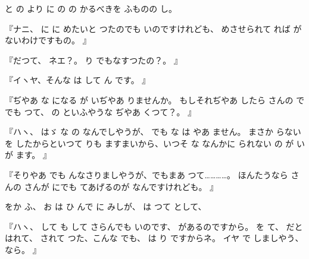 と
の
より
に
の
の
かるべきを
ふものの
し。

『ナニ、
に
に
めたいと
つたのでも
いのですけれども、
めさせられて
れば
がないわけですもの。
』

『だつて、
ネエ？。
り
でもなすつたの？。
』

『イヽヤ、そんな
は
して
ん
です。
』

『ぢやあ
な
になる
が
いぢやあ
りませんか。
もしそれぢやあ
したら
さんの
で
でも
つて、
の
といふやうな
ぢやあ
くつて？。
』

『ハヽ、
はゞ
な
の
なんでしやうが、
でも
な
は
やあ
ません。
まさか
らない
を
したからといつて
りも
ますまいから、いつそ
な
なんかに
られない
の
が
い
が
ます。
』

『そりやあ
でも
んなさりましやうが、でもまあ
つて…………。
ほんたうなら
さんの
さんが
にでも
てあげるのが
なんですけれども。
』

をか
ふ、
お
は
ひ
んで
に
みしが、
は
つて
として、

『ハヽ、
して
も
して
さらんでも
いのです、
があるのですから。
を
て、
だと
はれて、
されて
つた、こんな
でも、
は
り
ですからネ。
イヤ
で
しましやう、
なら。
』

